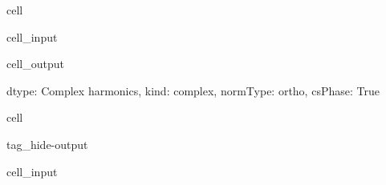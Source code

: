 \documentclass[letterpaper,table,10pt,english]{jupyterBook}
\begin{document}
\begin{sphinxuseclass}{cell}\begin{sphinxVerbatimInput}

\begin{sphinxuseclass}{cell_input}
\begin{sphinxVerbatim}[commandchars=\\\{\}]
\PYG{p}{[}\PYG{p}{]}
\end{sphinxVerbatim}

\end{sphinxuseclass}\end{sphinxVerbatimInput}
\begin{sphinxVerbatimOutput}

\begin{sphinxuseclass}{cell_output}
\begin{sphinxVerbatim}[commandchars=\\\{\}]
\PYGZob{}\PYGZsq{}dtype\PYGZsq{}: \PYGZsq{}Complex harmonics\PYGZsq{},
 \PYGZsq{}kind\PYGZsq{}: \PYGZsq{}complex\PYGZsq{},
 \PYGZsq{}normType\PYGZsq{}: \PYGZsq{}ortho\PYGZsq{},
 \PYGZsq{}csPhase\PYGZsq{}: True\PYGZcb{}
\end{sphinxVerbatim}

\end{sphinxuseclass}\end{sphinxVerbatimOutput}

\end{sphinxuseclass}
\begin{sphinxuseclass}{cell}
\begin{sphinxuseclass}{tag_hide-output}\begin{sphinxVerbatimInput}

\begin{sphinxuseclass}{cell_input}
\begin{sphinxVerbatim}[commandchars=\\\{\}]

  \PYG{p}{[}\PYG{p}{]}  

         
\end{sphinxVerbatim}

\end{sphinxuseclass}\end{sphinxVerbatimInput}

\end{sphinxuseclass}
\end{sphinxuseclass}
\end{document}
